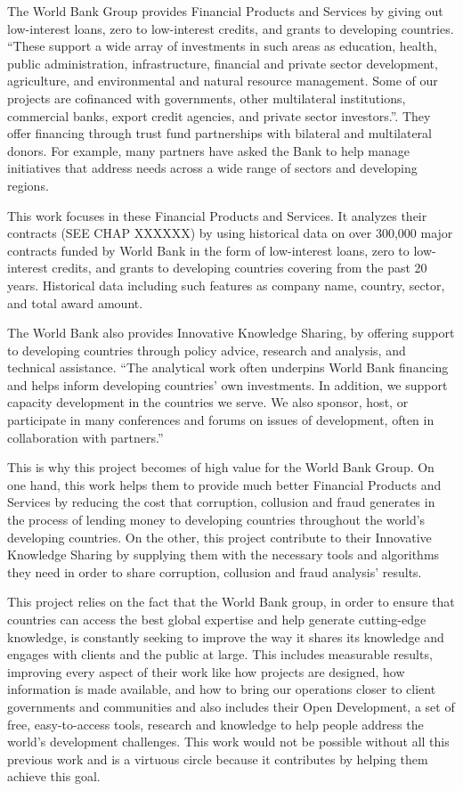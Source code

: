 The World Bank Group provides Financial Products and Services by giving out low-interest loans, zero to low-interest credits, and grants to developing countries. ``These support a wide array of investments in such areas as education, health, public administration, infrastructure, financial and private sector development, agriculture, and environmental and natural resource management. Some of our projects are cofinanced with governments, other multilateral institutions, commercial banks, export credit agencies, and private sector investors.''\parencite{wb_about}. They offer financing through trust fund partnerships with bilateral and multilateral donors. For example, many partners have asked the Bank to help manage initiatives that address needs across a wide range of sectors and developing regions.

This work focuses in these Financial Products and Services. It analyzes their contracts (SEE CHAP XXXXXX) by using historical data on over 300,000 major contracts funded by World Bank in the form of low-interest loans, zero to low-interest credits, and grants to developing countries covering  from the past 20 years. Historical data including such features as company name, country, sector, and total award amount.

The World Bank also provides Innovative Knowledge Sharing, by offering support to developing countries through policy advice, research and analysis, and technical assistance. ``The analytical work often underpins World Bank financing and helps inform developing countries' own investments. In addition, we support capacity development in the countries we serve. We also sponsor, host, or participate in many conferences and forums on issues of development, often in collaboration with partners.''\parencite{wb_about}

This is why this project becomes of high value for the World Bank Group. On one hand, this work helps them to provide much better Financial Products and Services by reducing the cost that corruption, collusion and fraud generates in the process of lending money to developing countries throughout the world's developing countries. On the other, this project contribute to their Innovative Knowledge Sharing by supplying them with the necessary tools and algorithms they need in order to share corruption, collusion and fraud analysis' results.

This project relies on the fact that the World Bank group, in order to ensure that countries can access the best global expertise and help generate cutting-edge knowledge, is constantly seeking to improve the way it shares its knowledge and engages with clients and the public at large. This includes  measurable results, improving every aspect of their work like how projects are designed, how information is made available, and how to bring our operations closer to client governments and communities and also includes  their Open Development, a set of free, easy-to-access tools, research and knowledge to help people address the world's development challenges. This work would not be possible without all this previous work and is a virtuous circle because it contributes by helping them achieve this goal.

